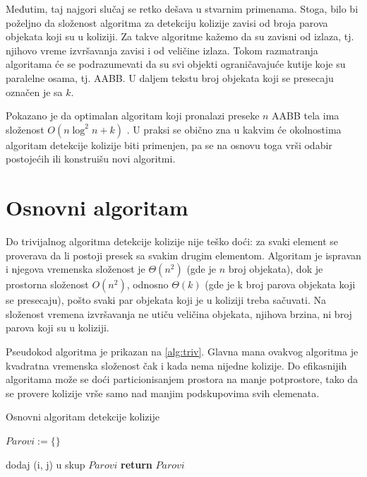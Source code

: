 \documentclass[12pt,oneside]{memoir}
\begin{document}
Međutim, taj najgori slučaj se retko dešava u stvarnim primenama. 
Stoga, bilo bi poželjno da složenost algoritma za detekciju kolizije zavisi od broja parova objekata koji su u koliziji.
Za takve algoritme kažemo da su zavisni od izlaza, tj. njihovo vreme izvršavanja zavisi i od veličine izlaza. 
Tokom razmatranja algoritama će se podrazumevati da su svi objekti ograničavajuće kutije koje su paralelne osama,
tj. AABB. U daljem tekstu broj objekata koji se presecaju označen je sa $k$.

Pokazano je da optimalan algoritam koji pronalazi preseke $n$ AABB tela ima složenost 
$O(n \log^2 n + k)$ \cite{glavna1}. 
U praksi se obično zna u kakvim će okolnostima algoritam detekcije kolizije biti primenjen, pa 
se na osnovu toga vrši odabir postojećih ili konstruišu novi algoritmi.

\section{Osnovni algoritam}
\label{subsec:triv}

Do trivijalnog algoritma detekcije kolizije nije teško doći: za svaki element se proverava da li postoji presek sa svakim drugim elementom.
Algoritam je ispravan i njegova vremenska složenost je $\Theta (n^2) $ (gde je $n$ broj objekata), dok je prostorna složenost
$O(n^2)$, odnosno $\Theta(k)$ (gde je k broj parova objekata koji se presecaju), pošto svaki par objekata koji je u koliziji treba sačuvati.
Na složenost vremena izvršavanja ne utiču veličina objekata, njihova brzina, ni broj parova koji su u koliziji.

Pseudokod algoritma je prikazan na \ref{alg:triv}.
Glavna mana ovakvog algoritma je kvadratna vremenska složenost čak i kada nema nijedne kolizije.
Do efikasnijih algoritama može se doći particionisanjem prostora na manje potprostore, tako da
se provere kolizije vrše samo nad manjim podskupovima svih elemenata.

\begin{algorithm}
	\caption{Osnovni algoritam detekcije kolizije}
    \label{alg:triv}
	\begin{algorithmic}[1]
		\State $Parovi := \{ \}$

				\State dodaj (i, j) u skup $Parovi$
			\EndIf		
		\EndFor
		\EndFor
		\State \textbf{return} $Parovi$
		\EndProcedure
    \end{algorithmic}
\end{algorithm}
\end{document}
